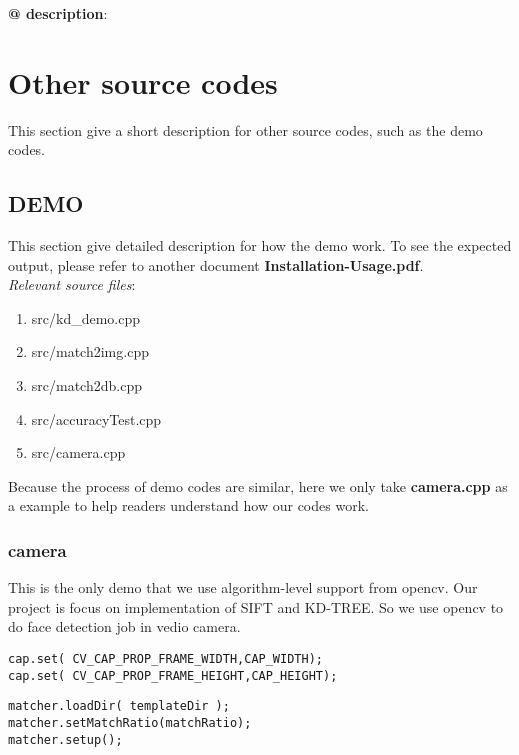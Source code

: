 \documentclass[paper=a4, fontsize=11pt]{scrartcl} %
\newcounter{subsubsubsection}[subsubsection]
\numberwithin{equation}{section} %
\numberwithin{figure}{section} %
\numberwithin{table}{section} %
\begin{document}
\textbf{@ description}: 

\section{Other source codes}

This section give a short description for other source codes, such as the demo codes.

\subsection{DEMO}

This section give detailed description for how the demo work. To see the expected output, please refer to another document \textbf{Installation-Usage.pdf}. \\


\textsl{Relevant source files}: 

\begin{enumerate}
    \item src/kd\_demo.cpp
    \item src/match2img.cpp
    \item src/match2db.cpp
    \item src/accuracyTest.cpp
    \item src/camera.cpp
\end{enumerate}

Because the process of demo codes are similar, here we only take \textbf{camera.cpp} as a example to help readers understand how our codes work.

\subsubsection{camera}

This is the only demo that we use algorithm-level support from opencv. Our project is focus on implementation of SIFT and KD-TREE. So we use opencv to do face detection job in vedio camera.


\begin{lstlisting}
cap.set( CV_CAP_PROP_FRAME_WIDTH,CAP_WIDTH);
cap.set( CV_CAP_PROP_FRAME_HEIGHT,CAP_HEIGHT);
\end{lstlisting}


\begin{lstlisting}
matcher.loadDir( templateDir );
matcher.setMatchRatio(matchRatio);
matcher.setup();
\end{lstlisting}
\end{document}
